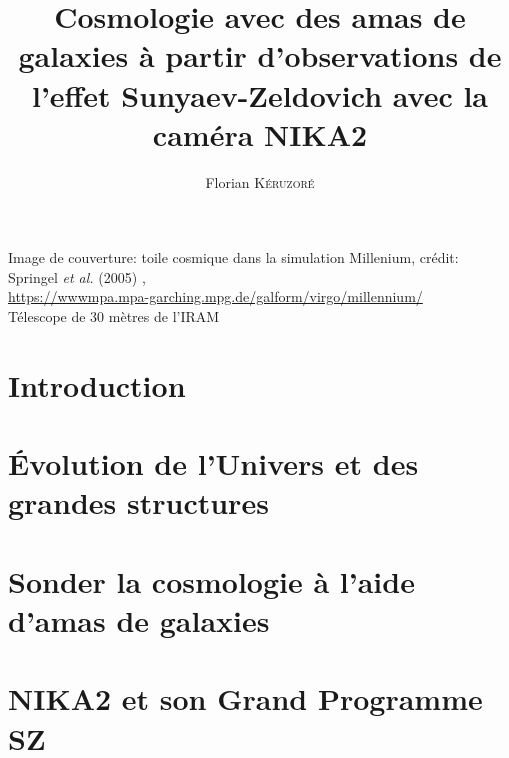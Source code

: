 \documentclass[a4paper, 12pt, twoside]{book}
\title{Cosmologie avec des amas de galaxies à partir d'observations de l'effet Sunyaev-Zeldovich avec la caméra NIKA2}
\author{Florian \textsc{K\'eruzor\'e}}
\date{}
\begin{document}
\begin{titlepage}
    
\end{titlepage}

\phantom{ }
\vfill
{\footnotesize \noindent
    Image de couverture: toile cosmique dans la simulation Millenium,
    crédit: Springel \textit{et al.} (2005) \cite{springel_simulations_2005}, \\
    \url{https://wwwmpa.mpa-garching.mpg.de/galform/virgo/millennium/} \\
    Télescope de 30 mètres de l'IRAM
}


\setlength{\parskip}{2.5pt}
\dominitoc[n]
\tableofcontents
\adjustmtc
\setlength{\parskip}{5pt}


\chapter*{Introduction}
\label{chap:intro}


\chapter{Évolution de l'Univers et des grandes structures}
\label{chap:cosmo1}
\minitoc


\chapter{Sonder la cosmologie à l'aide d'amas de galaxies}
\label{chap:amas}
\minitoc


\chapter{NIKA2 et son Grand Programme SZ}
\label{chap:nika2}
\minitoc

\end{document}
